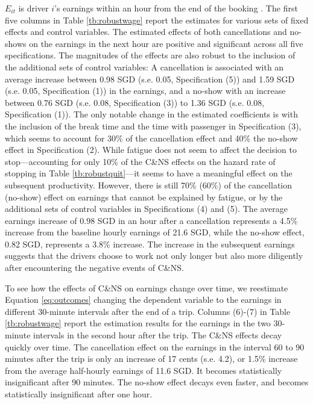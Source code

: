 \documentclass[reviewmode,AEJ]{AEA}
\begin{document}
$E_{it}$ is driver $i$'s earnings within an hour from the end of the booking%
. The first five columns in Table \ref{tb:robustwage} report the estimates for various sets of fixed effects and control variables. The estimated effects of both cancellations and no-shows on the earnings in the next hour are positive and significant across all five specifications. The magnitudes of the effects are also robust to the inclusion of the additional sets of control variables: A cancellation is associated with an average increase between 0.98 SGD (s.e. 0.05, Specification (5)) and 1.59 SGD (s.e. 0.05, Specification (1)) in the earnings, and a no-show with an increase between 0.76 SGD (s.e. 0.08, Specification (3)) to 1.36 SGD (s.e. 0.08, Specification (1)). The only notable change in the estimated coefficients is with the inclusion of the break time and the time with passenger in Specification (3), which seems to account for 30\% of the cancellation effect and 40\% the no-show effect in Specification (2). While fatigue does not seem to affect the decision to stop---accounting for only 10\% of the C\&NS effects on the hazard rate of stopping in Table \ref{tb:robustquit}---it seems to have a meaningful effect on the subsequent productivity. However, there is still 70\% (60\%) of the cancellation (no-show) effect %
on earnings that cannot be explained by fatigue, or by the additional sets of control variables in Specifications (4) and (5). The average earnings increase of 0.98 SGD in an hour after a cancellation %
represents a 4.5\% increase from the baseline hourly earnings of 21.6 SGD, while the no-show effect, 0.82 SGD, represents a 3.8\% increase. The increase in the subsequent earnings suggests that the drivers choose to work not only  longer but also more diligently after encountering the negative events of C\&NS.


To see how the effects of C\&NS on earnings change over time, we reestimate Equation \eqref{eq:outcomes} changing the dependent variable to the earnings in different 30-minute intervals after the end of a trip. Columns (6)-(7) in Table \ref{tb:robustwage} report the estimation results for the earnings in the two 30-minute intervals in the second hour after the trip. The C\&NS effects decay quickly over time. The cancellation effect on the earnings in the interval 60 to 90 minutes after the trip is only an increase of 17 cents (s.e. 4.2), or 1.5\% increase from the average half-hourly earnings of 11.6 SGD. It becomes statistically insignificant after 90 minutes. The no-show effect decays even faster, and becomes statistically insignificant after one hour.
\end{document}
